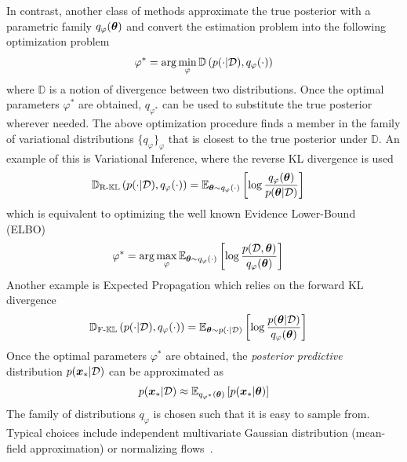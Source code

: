 In contrast, another class of methods approximate the true posterior with a parametric family $q_\varphi({\bm{\theta}})$ and convert the estimation problem into the following optimization problem
\begin{align}
    \varphi^* = \arg\min_\varphi \mathbb{D}\left(p(\cdot | {\mathcal{D}}), q_\varphi(\cdot)\right)
\end{align} 
where $\mathbb{D}$ is a notion of divergence between two distributions. Once the optimal parameters $\varphi^*$ are obtained, $q_{\varphi^*}$ can be used to substitute the true posterior wherever needed. The above optimization procedure finds a member in the family of variational distributions $\{q_\varphi\}_\varphi$ that is closest to the true posterior under $\mathbb{D}$. An example of this is Variational Inference, where the reverse KL divergence is used
\begin{align}
\label{eq:rkl}
\mathbb{D}_{\text{R-}\mathbb{KL}}\left(p(\cdot | {\mathcal{D}}), q_\varphi(\cdot)\right) &= \mathbb{E}_{{\bm{\theta}} \sim q_\varphi(\cdot)} \left[\log \frac{q_\varphi({\bm{\theta}})}{p({\bm{\theta}} | {\mathcal{D}})}\right]
\end{align}
which is equivalent to optimizing the well known Evidence Lower-Bound (ELBO)~\citep{Gelman2013-bayesdata}
\begin{align}
    \varphi^* &= \arg\max_\varphi {\mathbb{E}}_{{\bm{\theta}} \sim q_\varphi(\cdot)}\left[\log \frac{p({\mathcal{D}}, {\bm{\theta}})}{q_\varphi({\bm{\theta}})}\right]
\end{align}
Another example is Expected Propagation \citep[EP;][]{minka2013expectation} which relies on the forward KL divergence
\begin{align}
\label{eq:fkl}
\mathbb{D}_{\text{F-}\mathbb{KL}}\left(p(\cdot | {\mathcal{D}}), q_\varphi(\cdot)\right) &= \mathbb{E}_{{\bm{\theta}} \sim p(\cdot | {\mathcal{D}})} \left[\log \frac{p({\bm{\theta}} | {\mathcal{D}})}{q_\varphi({\bm{\theta}})}\right]
\end{align}
Once the optimal parameters $\varphi^*$ are obtained, the \textit{posterior predictive} distribution $p({\bm{x}}_* | {\mathcal{D}})$ can be approximated as
\begin{align}
    p({\bm{x}}_* | {\mathcal{D}}) \approx \mathbb{E}_{q_{\varphi^*}({\bm{\theta}})}\left[p({\bm{x}}_* | {\bm{\theta}})\right]
\end{align}
The family of distributions $q_\varphi$ is chosen such that it is easy to sample from. Typical choices include independent multivariate Gaussian distribution (mean-field approximation) or normalizing flows~\citep{rezende2015variational,papamakarios2021normalizing,freia}.

